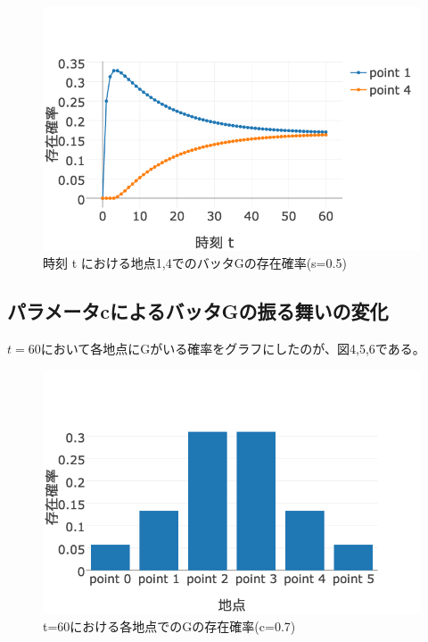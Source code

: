 \documentclass[11pt]{ltjsarticle}
\begin{document}
\begin{figure}
  \includegraphics[width=\textwidth]{fig3.png}
  \caption{時刻 t における地点1,4でのバッタGの存在確率(s=0.5)}
\end{figure}

\subsection{パラメータcによるバッタGの振る舞いの変化}
	$t=60$において各地点にGがいる確率をグラフにしたのが、図4,5,6である。

\begin{figure}
  \includegraphics[width=\textwidth]{fig4.png}
  \caption{ t=60における各地点でのGの存在確率(c=0.7)}
\end{figure}
\end{document}
